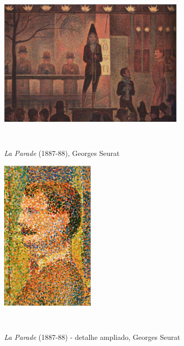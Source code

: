 \begin{figure}[H]
  \begin{center}
    \caption{\textit{La Parade} (1887-88), Georges Seurat}
    \vspace*{0,2cm}
    \includegraphics[width=0.8\textwidth]{./04-figuras/seurat_la_parede}
    \label{fig:seurat_la_parede}
  \end{center}
  \vspace*{-0,9cm}
  \\
\end{figure}

\begin{figure}[H]
  \begin{center}
    \caption{\textit{La Parade} (1887-88) - detalhe ampliado, Georges Seurat}
    \vspace*{0,2cm}
    \includegraphics[width=0.4\textwidth]{./04-figuras/seurat_la_parede_detalhe}
    \label{fig:seurat_la_parede_detalhe}
  \end{center}
  \vspace*{-0,9cm}
  \\
\end{figure}



